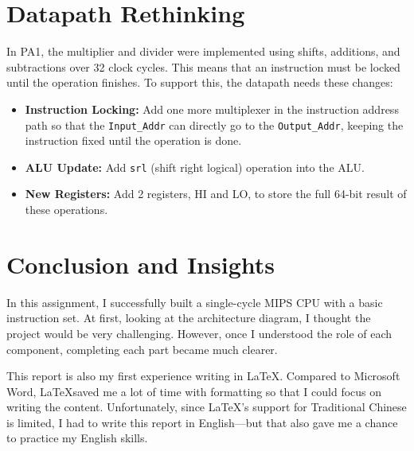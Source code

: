 \documentclass[12pt]{article}
\begin{document}

\section{Datapath Rethinking}

In PA1, the multiplier and divider were implemented using shifts, additions, and subtractions over 32 clock cycles. This means that an instruction must be locked until the operation finishes. To support this, the datapath needs these changes:
\begin{itemize}
    \item \textbf{Instruction Locking:} Add one more multiplexer in the instruction address path so that the \texttt{Input\_Addr} can directly go to the \texttt{Output\_Addr}, keeping the instruction fixed until the operation is done.
    \item \textbf{ALU Update:} Add \texttt{srl} (shift right logical) operation into the ALU.
    \item \textbf{New Registers:} Add 2 registers, HI and LO, to store the full 64-bit result of these operations.
\end{itemize}


\section{Conclusion and Insights}

In this assignment, I successfully built a single-cycle MIPS CPU with a basic instruction set. At first, looking at the architecture diagram, I thought the project would be very challenging. However, once I understood the role of each component, completing each part became much clearer.

This report is also my first experience writing in \LaTeX. Compared to Microsoft Word, \LaTeX saved me a lot of time with formatting so that I could focus on writing the content. Unfortunately, since \LaTeX's support for Traditional Chinese is limited, I had to write this report in English—but that also gave me a chance to practice my English skills.
\end{document}

